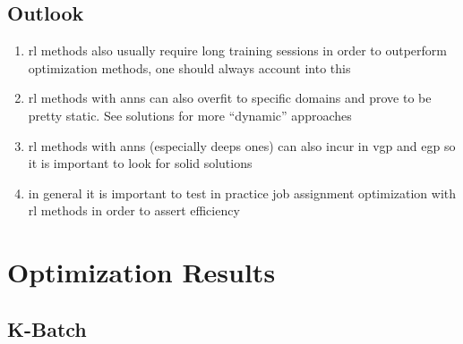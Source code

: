 \documentclass{seal_thesis}
\begin{document}
\section{Outlook}

\begin{enumerate}
	\item \gls{rl} methods also usually require long training sessions in order to outperform optimization methods, one should always account into this
	\item \gls{rl} methods with \glspl{ann} can also overfit to specific domains and prove to be pretty static. See solutions for more ``dynamic'' approaches
	\item \gls{rl} methods with \glspl{ann} (especially deeps ones) can also incur in \gls{vgp} and \gls{egp} so it is important to look for solid solutions
	\item in general it is important to test in practice job assignment optimization with \gls{rl} methods in order to assert efficiency
\end{enumerate}

\appendix

\chapter{Optimization Results}

\section{K-Batch}

\subsection{}
\label{subsec:kbatch_kpi_app}


\clearpage
\end{document}
